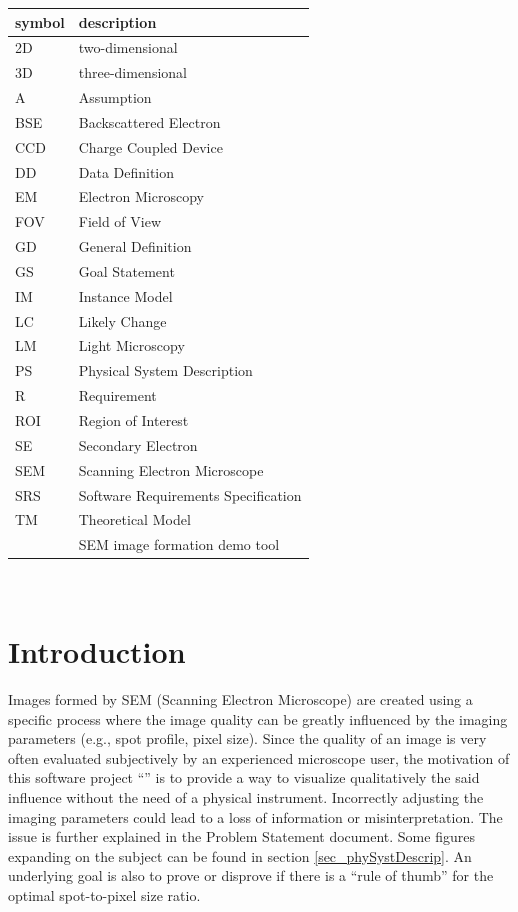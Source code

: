 \documentclass[12pt]{article}
\begin{document}
\renewcommand{\arraystretch}{1.2}
\begin{tabular}{l l} 
  \toprule		
  \textbf{symbol} & \textbf{description}\\
  \midrule 
  2D & two-dimensional\\
  3D & three-dimensional\\
  A & Assumption\\
  BSE & Backscattered Electron\\
  CCD & Charge Coupled Device\\
  DD & Data Definition\\
  EM & Electron Microscopy\\
  FOV & Field of View\\
  GD & General Definition\\
  GS & Goal Statement\\
  IM & Instance Model\\
  LC & Likely Change\\
  LM & Light Microscopy\\
  PS & Physical System Description\\
  R & Requirement\\
  ROI & Region of Interest\\
  SE & Secondary Electron\\
  SEM & Scanning Electron Microscope\\
  SRS & Software Requirements Specification\\
  TM & Theoretical Model\\
  \progname{} & SEM image formation demo tool\\
  \bottomrule
\end{tabular}\\

\newpage


\section{Introduction}

Images formed by SEM (Scanning Electron Microscope) are created using a 
specific process where the image quality can be greatly influenced by the 
imaging parameters (e.g., spot profile, pixel size). Since the quality of 
an image is very often evaluated subjectively by an experienced microscope 
user, the motivation of this software project ``\progname{}'' is to provide a way to visualize 
qualitatively the said influence without the need of a physical instrument.
Incorrectly adjusting the imaging parameters could lead to a loss of information 
or misinterpretation. The issue is further explained in the 
Problem Statement document. Some figures expanding on the subject can be
found in section \ref{sec_phySystDescrip}.
An underlying goal is also to prove or disprove if 
there is a ``rule of thumb'' for the optimal spot-to-pixel size ratio.
\end{document}
